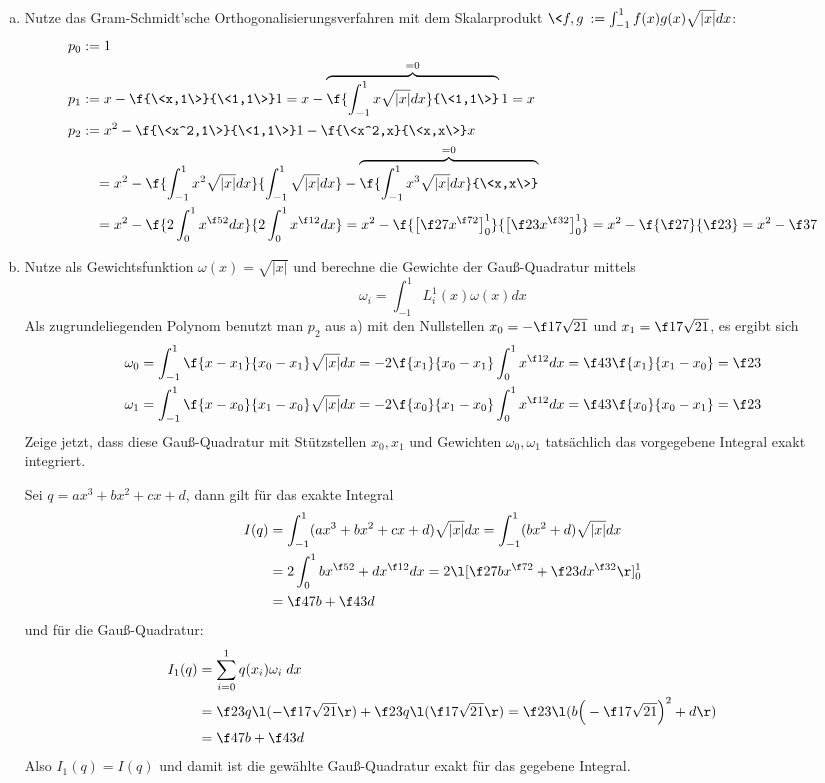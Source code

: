 \documentclass[a4paper]{scrartcl}
\begin{document}
\begin{aufgabe}
	\begin{enumerate}[a)]
		\item
			Nutze das Gram-Schmidt'sche Orthogonalisierungsverfahren mit dem Skalarprodukt $\<f,g\> := \int_{-1}^1 f(x)g(x) \sqrt{|x|} dx$:
			\begin{align*}
				p_0 &:= 1 \\
				p_1 &:= x - \f {\<x,1\>}{\<1,1\>}1 = x - \overbrace{\f{\int_{-1}^1 x\sqrt{|x|} dx}{\<1,1\>}}^{=0} 1 = x \\
				p_2 &:= x^2 - \f {\<x^2,1\>}{\<1,1\>} 1 - \f{\<x^2,x}{\<x,x\>}x \\
				&\quad = x^2 - \f{\int_{-1}^1 x^2\sqrt{|x|} dx}{\int_{-1}^1 \sqrt{|x|} dx} - \overbrace{\f{\int_{-1}^1 x^3 \sqrt{|x|} dx}{\<x,x\>}}^{=0} \\
				&\quad = x^2 - \f {2 \int_0^1 x^{\f 52} dx} {2\int_0^1 x^{\f 12} dx} 
				= x^2 - \f {\big[\f 27x^{\f72}\big]_0^1}{\big[\f 23x^{\f 32}\big]_0^1}
				= x^2 - \f {\f 27}{\f 23}
				= x^2 - \f 37
			\end{align*}
		\item
			Nutze als Gewichtsfunktion $\omega(x) = \sqrt{|x|}$ und berechne die Gewichte der Gauß-Quadratur mittels
			\[
				\omega_i = \int_{-1}^1 L_i^1 (x) \omega(x) dx
			\]
			Als zugrundeliegenden Polynom benutzt man $p_2$ aus a) mit den Nullstellen $x_0=-\f 17\sqrt{21}$  und $x_1=\f 17\sqrt{21}$, es ergibt sich
			\begin{align*}
				\omega_0 &= \int_{-1}^1 \f {x-x_1}{x_0-x_1}\sqrt{|x|} dx = -2 \f{x_1}{x_0-x_1} \int_0^1 x^{\f 12} dx = \f 43 \f {x_1}{x_1-x_0} = \f 23 \\
				\omega_1 &= \int_{-1}^1 \f{x-x_0}{x_1-x_0}\sqrt{|x|} dx = -2 \f{x_0}{x_1-x_0} \int_0^1 x^{\f 12} dx = \f 43 \f {x_0}{x_0-x_1} = \f 23
			\end{align*}
			Zeige jetzt, dass diese Gauß-Quadratur mit Stützstellen $x_0, x_1$ und Gewichten $\omega_0,\omega_1$ tatsächlich das vorgegebene Integral exakt integriert.

			Sei $q=ax^3 + bx^2 + cx + d$, dann gilt für das exakte Integral
			\begin{align*}
				I(q) 
				&= \int_{-1}^1 (ax^3 + bx^2 + cx + d)\sqrt{|x|} dx 
				= \int_{-1}^1 (bx^2 + d)\sqrt{|x|} dx \\
				&= 2 \int_0^1 bx^{\f 52} + dx^{\f 12} dx 
				= 2 \l[ \f 27 bx^{\f 72} + \f 23 dx^{\f 32}\r]_0^1 \\
				&= \f 47 b + \f 43 d
			\end{align*}
			und für die Gauß-Quadratur:
			\begin{align*}
				I_1(q)
				&= \sum_{i=0}^1 q(x_i) \omega_i \;dx \\
				&= \f 23 q\l( -\f17 \sqrt{21}\r) + \f 23 q\l(\f 17 \sqrt{21}\r) 
				= \f 23 \l( b\Big(-\f 17 \sqrt{21}\Big)^2 + d \r) \\
				&= \f 47 b + \f 43 d
			\end{align*}
			Also $I_1(q) = I(q)$ und damit ist die gewählte Gauß-Quadratur exakt für das gegebene Integral.
	\end{enumerate}
\end{aufgabe}
\end{document}
